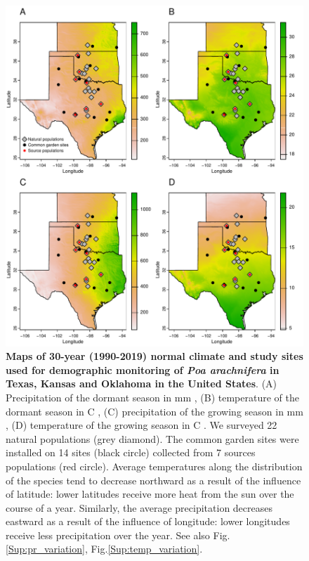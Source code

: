 \documentclass[12pt]{article}\usepackage[]{graphicx}\usepackage[dvipsnames]{xcolor}
\begin{document}
\begin{figure}[H]
  \begin{center}
    \includegraphics[width=0.90\linewidth]{Figures/POAR_survey_garden_map.pdf}
  \caption{\textbf{Maps of 30-year (1990-2019) normal climate and study sites used for demographic monitoring of \emph{Poa arachnifera} in Texas, Kansas and Oklahoma in the United States}.
  (A) Precipitation of the dormant season in mm , (B) temperature of the dormant season in \degree C , (C) precipitation of the growing season in mm , (D) temperature of the growing season in \degree C . 
  We surveyed 22 natural populations (grey diamond).
  The common garden sites were installed on 14 sites (black circle) collected from 7 sources populations (red circle). 
  Average temperatures along the distribution of the species tend to decrease northward as a result of the influence of latitude: lower latitudes receive more heat from the sun over the course of a year. 
  Similarly, the average precipitation decreases eastward as a result of the influence of longitude:  lower longitudes receive less precipitation over the year.
  See also Fig.\ref{Sup:pr_variation}, Fig.\ref{Sup:temp_variation}.}
  \label{fig:study_design}
  \end{center}
\end{figure}
\end{document}
